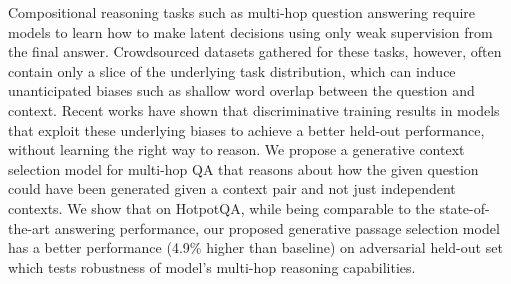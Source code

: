 Compositional reasoning tasks such as multi-hop question answering require models to learn how to make latent decisions using only weak supervision from the final answer. Crowdsourced datasets gathered for these tasks, however, often contain only a slice of the underlying task distribution, which can induce unanticipated biases such as shallow word overlap between the question and context. Recent works have shown that discriminative training results in models that exploit these underlying biases to achieve a better held-out performance, without learning the right way to reason. We propose a generative context selection model for multi-hop QA that reasons about how the given question could have been generated given a context pair and not just independent contexts. We show that on HotpotQA, while being comparable to the state-of-the-art answering performance, our proposed generative passage selection model has a better performance (4.9\% higher than baseline) on adversarial held-out set which tests robustness of model's multi-hop reasoning capabilities.
